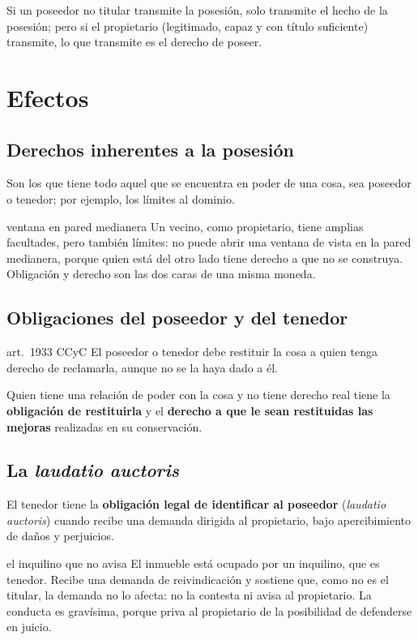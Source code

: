 \documentclass[12pt,oneside]{book}
\begin{document}
Si un poseedor no titular transmite la posesión, solo transmite el hecho de la posesión; pero si el propietario (legitimado, capaz y con título suficiente) transmite, lo que transmite es el derecho de poseer.

\section{Efectos}

\subsection{Derechos inherentes a la posesión}

Son los que tiene todo aquel que se encuentra en poder de una cosa, sea poseedor o tenedor; por ejemplo, los límites al dominio.

\begin{ejemplo}{ventana en pared medianera}
Un vecino, como propietario, tiene amplias facultades, pero también límites: no puede abrir una ventana de vista en la pared medianera, porque quien está del otro lado tiene derecho a que no se construya. Obligación y derecho son las dos caras de una misma moneda.
\end{ejemplo}

\subsection{Obligaciones del poseedor y del tenedor}

\begin{regla}{art.~1933 CCyC}
El poseedor o tenedor debe restituir la cosa a quien tenga derecho de reclamarla, aunque no se la haya dado a él.
\end{regla}

Quien tiene una relación de poder con la cosa y no tiene derecho real tiene la \textbf{obligación de restituirla} y el \textbf{derecho a que le sean restituidas las mejoras} realizadas en su conservación.

\subsection{La \textit{laudatio auctoris}}

El tenedor tiene la \textbf{obligación legal de identificar al poseedor} (\textit{laudatio auctoris}) cuando recibe una demanda dirigida al propietario, bajo apercibimiento de daños y perjuicios.

\begin{ejemplo}{el inquilino que no avisa}
El inmueble está ocupado por un inquilino, que es tenedor. Recibe una demanda de reivindicación y sostiene que, como no es el titular, la demanda no lo afecta: no la contesta ni avisa al propietario. La conducta es gravísima, porque priva al propietario de la posibilidad de defenderse en juicio.
\end{ejemplo}
\end{document}
